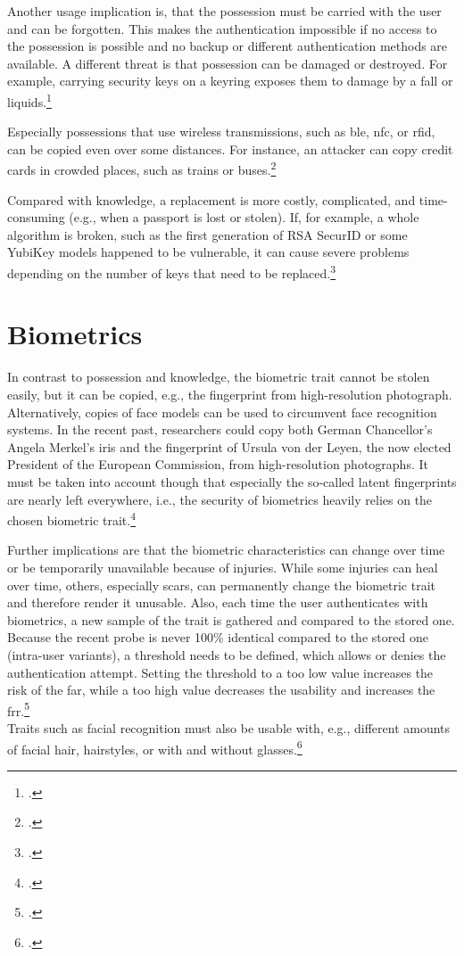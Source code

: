 Another usage implication is, that the possession must be carried with the user and can be forgotten. This makes the authentication impossible if no access to the possession is possible and no backup or different authentication methods are available. A different threat is that possession can be damaged or destroyed. For example, carrying security keys on a keyring exposes them to damage by a fall or liquids.\footcites[See][263--264]{shostack2014threat}

Especially possessions that use wireless transmissions, such as \gls{ble}, \gls{nfc}, or \gls{rfid}, can be copied even over some distances. For instance, an attacker can copy credit cards in crowded places, such as trains or buses.\footcite[See][2--3]{6892730}

Compared with knowledge, a replacement is more costly, complicated, and time-consuming (e.g., when a passport is lost or stolen). If, for example, a whole algorithm is broken, such as the first generation of RSA SecurID or some YubiKey models happened to be vulnerable, it can cause severe problems depending on the number of keys that need to be replaced.\footcites[See][18]{dasgupta2017multi}[See][364--265]{BIRYUKOV2005364}[See][]{yubikey-heise}

\section{Biometrics}

In contrast to possession and knowledge, the biometric trait cannot be stolen easily, but it can be copied, e.g., the fingerprint from high-resolution photograph. Alternatively, copies of face models can be used to circumvent face recognition systems. In the recent past, researchers could copy both German Chancellor's Angela Merkel's iris and the fingerprint of Ursula von der Leyen, the now elected President of the European Commission, from high-resolution photographs. It must be taken into account though that especially the so-called latent fingerprints are nearly left everywhere, i.e., the security of biometrics heavily relies on the chosen biometric trait.\footcites[See][7--8]{185181}[See][7--8]{220566}[See][p. e199]{MARTIN2013e189}[See][]{ccc-merkel}

Further implications are that the biometric characteristics can change over time or be temporarily unavailable because of injuries. While some injuries can heal over time, others, especially scars, can permanently change the biometric trait and therefore render it unusable. Also, each time the user authenticates with biometrics, a new sample of the trait is gathered and compared to the stored one. Because the recent probe is never 100\% identical compared to the stored one (\frqq intra-user variants\flqq), a threshold needs to be defined, which allows or denies the authentication attempt. Setting the threshold to a too low value increases the risk of the \gls{far}, while a too high value decreases the usability and increases the \gls{frr}.\footcite[See][13--17, 52]{Jain2011}\\Traits such as facial recognition must also be usable with, e.g., different amounts of facial hair, hairstyles, or with and without glasses.\footcite[See][98]{Jain2011}

